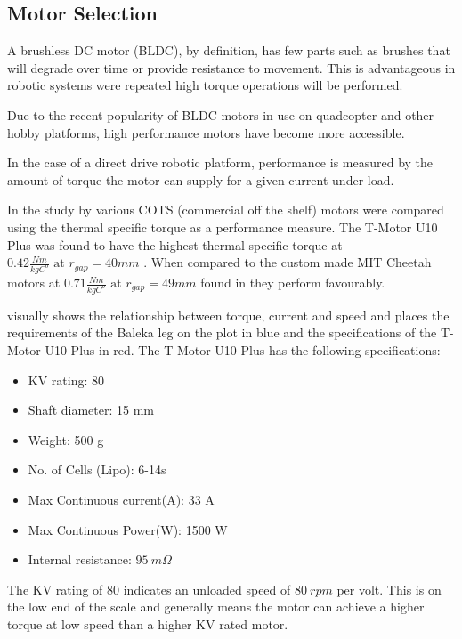 \subsection{Motor Selection}
\label{sec:Motor Selection}

A brushless DC motor (BLDC), by definition, has few parts such as brushes that will degrade over time or provide resistance to movement. This is advantageous in robotic systems were repeated high torque operations will be performed.

Due to the recent popularity of BLDC motors in use on quadcopter and other hobby platforms, high performance motors have become more accessible. 

In the case of a direct drive robotic platform, performance is measured by the amount of torque the motor can supply for a given current under load.

In the study by \cite{Kalouche2016} various COTS (commercial off the shelf) motors were compared using the thermal specific torque as a performance measure. The T-Motor U10 Plus was found to have the highest thermal specific torque at $0.42 \frac{Nm}{kgC^o } \text{ at } r_{gap} = 40 mm$ \cite{Kalouche2016}. When compared to the custom made MIT Cheetah motors at $0.71 \frac{Nm}{kgC^o } \text{ at } r_{gap} = 49 mm$ found in \cite{Wang2012} they perform favourably. 

 visually shows the relationship between torque, current and speed and places the requirements of the Baleka leg on the plot in blue and the specifications of the T-Motor U10 Plus in red. The T-Motor U10 Plus has the following specifications:

\begin{itemize}
\item KV rating: 80
\item Shaft diameter: 15 mm
\item Weight: 500 g
\item No. of Cells (Lipo): 6-14s
\item Max Continuous current(A): 33 A
\item Max Continuous Power(W): 1500 W
\item Internal resistance: $95\ m\Omega$
\end{itemize}

The KV rating of 80 indicates an unloaded speed of $80\ rpm$ per volt. This is on the low end of the scale and generally means the motor can achieve a higher torque at low speed than a higher KV rated motor.

